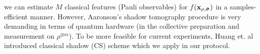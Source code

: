 \documentclass[
aps,
pra,
twocolumn,
floatfix,
]{revtex4-2}
\theoremstyle{plain}
\theoremstyle{definition}
\newtheorem{remark}{Remark}
\newcommand{\ob}{O}
\newcommand{\dm}{\rho}
\newcommand{\cs}{\text{cs}}
\newcommand{\bmsigma}{\bm{\sigma}}
\begin{document}
we can estimate $M$ classical features (Pauli observables) for $f(\vbx_{\dm,\tilde{\bmsigma}})$ in a samples-efficient manner.
However, Aaronson's shadow tomography procedure is very demanding in terms of quantum hardware (in the collective preparation and measurement on $\dm^{\otimes m}$).
To be more feasible for current experiments, Huang et. al \cite{huangPredictingManyProperties2020} introduced classical shadow (CS) scheme which we apply in our protocol.

\end{document}
